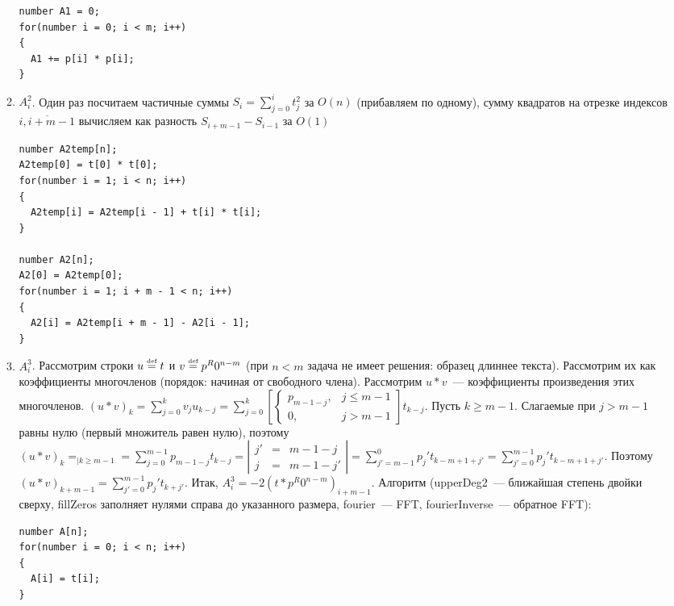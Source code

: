 \documentclass[a4paper]{article}
\def\eqdef{\overset{\mbox{\tiny def}}{=}}
\begin{document}
\begin{enumerate}
\begin{enumerate}
{}
\begin{lstlisting}
number A1 = 0;
for(number i = 0; i < m; i++)
{
  A1 += p[i] * p[i];
}
\end{lstlisting}
\item $A_i^2$. Один раз посчитаем частичные суммы $S_i=\sum\limits_{j=0}^{i}t_j^2$ за $O(n)$ (прибавляем по одному), сумму квадратов на отрезке индексов $\overline{i,i+m-1}$ вычисляем как разность $S_{i+m-1}-S_{i-1}$ за $O(1)$
\begin{lstlisting}
number A2temp[n];
A2temp[0] = t[0] * t[0];
for(number i = 1; i < n; i++)
{
  A2temp[i] = A2temp[i - 1] + t[i] * t[i];
}

number A2[n];
A2[0] = A2temp[0];
for(number i = 1; i + m - 1 < n; i++)
{
  A2[i] = A2temp[i + m - 1] - A2[i - 1];
}
\end{lstlisting}
\item \label{fmult} $A_i^3$. Рассмотрим строки $u\eqdef t$ и $v\eqdef p^R0^{n-m}$ (при $n<m$ задача не имеет решения: образец длиннее текста). Рассмотрим их как коэффициенты многочленов (порядок: начиная от свободного члена). Рассмотрим $u* v$~--- коэффициенты произведения этих многочленов. $(u* v)_k=\sum\limits_{j=0}^{k}v_ju_{k-j}=\sum\limits_{j=0}^k\left[\begin{cases}
p_{m-1-j}, & j \leqslant m-1\\
0, & j>m-1
\end{cases}\right] t_{k-j}$. Пусть $k\geqslant m-1$. Слагаемые при $j>m-1$ равны нулю (первый множитель равен нулю), поэтому $(u* v)_k=_{|k\geqslant m-1}=\sum\limits_{j=0}^{m-1}p_{m-1-j}t_{k-j}=\left|
\begin{array}{lcl}
j'&=&m-1-j\\
j&=&m-1-j'
\end{array}
\right|=\sum\limits_{j'=m-1}^0p_j't_{k-m+1+j'}=\sum\limits_{j'=0}^{m-1}p_j't_{k-m+1+j'}$. Поэтому $(u* v)_{k+m-1}=\sum\limits_{j'=0}^{m-1}p_j't_{k+j'}$.\newline
Итак, $A_i^3=-2(t* p^R0^{n-m})_{i+m-1}$.\newpage
Алгоритм (upperDeg2~--- ближайшая степень двойки сверху, fillZeros заполняет нулями справа до указанного размера, fourier~--- FFT, fourierInverse~--- обратное FFT):
\begin{lstlisting}
number A[n];
for(number i = 0; i < n; i++)
{
  A[i] = t[i];
}


\end{lstlisting}
\end{enumerate}
\end{enumerate}
\end{document}
